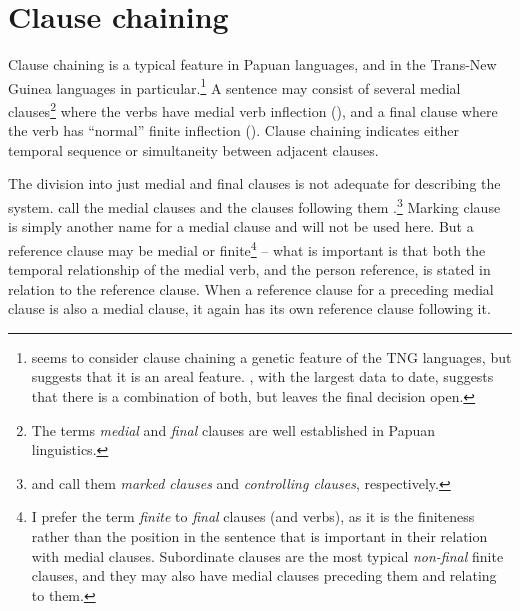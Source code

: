 \section{Clause chaining}

Clause chaining is a typical feature in Papuan languages, and in the Trans-New Guinea languages in particular.\footnote{\citet[36]{Wurm1982} seems to consider clause chaining a genetic feature of the TNG languages, but \citet[xlvii]{Haiman1980} suggests that it is an areal feature. \citet[122]{Roberts1997}, with the largest data to date, suggests that there is a combination of both, but leaves the final decision open.}  A sentence may consist of several medial clauses\footnote{The terms \textit{medial} and \textit{final} clauses are well established in Papuan linguistics. }   where the verbs have medial verb inflection (), and a final clause where the verb has ``normal'' finite inflection (). Clause chaining indicates either temporal sequence or simultaneity between adjacent clauses.

The division into just medial and final clauses is not adequate for describing the system. \citet[xii]{HaimanEtAt1983} call the medial clauses  and the clauses following them .\footnote{\citet{Comrie1983} and \citet{Roberts1997} call them \textit{marked clauses} and \textit{controlling clauses}, respectively.} Marking clause is simply another name for a medial clause and will not be used here. But a reference clause may be medial or finite\footnote{I prefer the term \textit{finite} to \textit{final} clauses (and verbs), as it is the finiteness rather than the position in the sentence that is important in their relation with medial clauses. Subordinate clauses are the most typical \textit{non-final} finite clauses, and they may also have medial clauses preceding them and relating to them.} -- what is important is that both the temporal relationship of the medial verb, and the person reference, is stated in relation to the reference clause. When a reference clause for a preceding medial clause is also a medial clause, it again has its own reference clause following it.

